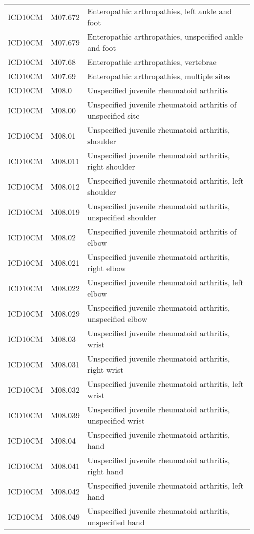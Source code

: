 \begin{table}[ht]
\begin{tabular}{lll}
  ICD10CM & M07.672 & Enteropathic arthropathies, left ankle and foot \\ 
  ICD10CM & M07.679 & Enteropathic arthropathies, unspecified ankle and foot \\ 
  ICD10CM & M07.68 & Enteropathic arthropathies, vertebrae \\ 
  ICD10CM & M07.69 & Enteropathic arthropathies, multiple sites \\ 
  ICD10CM & M08.0 & Unspecified juvenile rheumatoid arthritis \\ 
  ICD10CM & M08.00 & Unspecified juvenile rheumatoid arthritis of unspecified site \\ 
  ICD10CM & M08.01 & Unspecified juvenile rheumatoid arthritis, shoulder \\ 
  ICD10CM & M08.011 & Unspecified juvenile rheumatoid arthritis, right shoulder \\ 
  ICD10CM & M08.012 & Unspecified juvenile rheumatoid arthritis, left shoulder \\ 
  ICD10CM & M08.019 & Unspecified juvenile rheumatoid arthritis, unspecified shoulder \\ 
  ICD10CM & M08.02 & Unspecified juvenile rheumatoid arthritis of elbow \\ 
  ICD10CM & M08.021 & Unspecified juvenile rheumatoid arthritis, right elbow \\ 
  ICD10CM & M08.022 & Unspecified juvenile rheumatoid arthritis, left elbow \\ 
  ICD10CM & M08.029 & Unspecified juvenile rheumatoid arthritis, unspecified elbow \\ 
  ICD10CM & M08.03 & Unspecified juvenile rheumatoid arthritis, wrist \\ 
  ICD10CM & M08.031 & Unspecified juvenile rheumatoid arthritis, right wrist \\ 
  ICD10CM & M08.032 & Unspecified juvenile rheumatoid arthritis, left wrist \\ 
  ICD10CM & M08.039 & Unspecified juvenile rheumatoid arthritis, unspecified wrist \\ 
  ICD10CM & M08.04 & Unspecified juvenile rheumatoid arthritis, hand \\ 
  ICD10CM & M08.041 & Unspecified juvenile rheumatoid arthritis, right hand \\ 
  ICD10CM & M08.042 & Unspecified juvenile rheumatoid arthritis, left hand \\ 
  ICD10CM & M08.049 & Unspecified juvenile rheumatoid arthritis, unspecified hand \\ 

\end{tabular}
\end{table}
